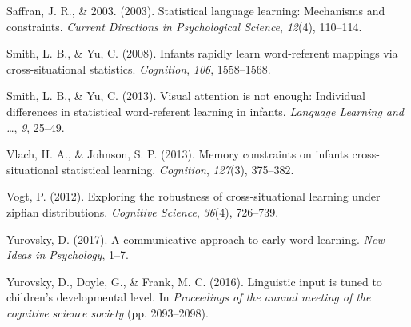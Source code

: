 \documentclass[10pt, letterpaper]{article}
\begin{document}
\leavevmode\hypertarget{ref-saffran2003}{}%
Saffran, J. R., \& 2003. (2003). Statistical language learning:
Mechanisms and constraints. \emph{Current Directions in Psychological
Science}, \emph{12}(4), 110--114.

\leavevmode\hypertarget{ref-smith2008}{}%
Smith, L. B., \& Yu, C. (2008). Infants rapidly learn word-referent
mappings via cross-situational statistics. \emph{Cognition}, \emph{106},
1558--1568.

\leavevmode\hypertarget{ref-smith2013}{}%
Smith, L. B., \& Yu, C. (2013). Visual attention is not enough:
Individual differences in statistical word-referent learning in infants.
\emph{Language Learning and \ldots{}}, \emph{9}, 25--49.

\leavevmode\hypertarget{ref-vlach2013}{}%
Vlach, H. A., \& Johnson, S. P. (2013). Memory constraints on infants
cross-situational statistical learning. \emph{Cognition}, \emph{127}(3),
375--382.

\leavevmode\hypertarget{ref-vogt2012}{}%
Vogt, P. (2012). Exploring the robustness of cross-situational learning
under zipfian distributions. \emph{Cognitive Science}, \emph{36}(4),
726--739.

\leavevmode\hypertarget{ref-yurovsky2017}{}%
Yurovsky, D. (2017). A communicative approach to early word learning.
\emph{New Ideas in Psychology}, 1--7.

\leavevmode\hypertarget{ref-yurovsky2016}{}%
Yurovsky, D., Doyle, G., \& Frank, M. C. (2016). Linguistic input is
tuned to children's developmental level. In \emph{Proceedings of the
annual meeting of the cognitive science society} (pp. 2093--2098).


\end{document}
